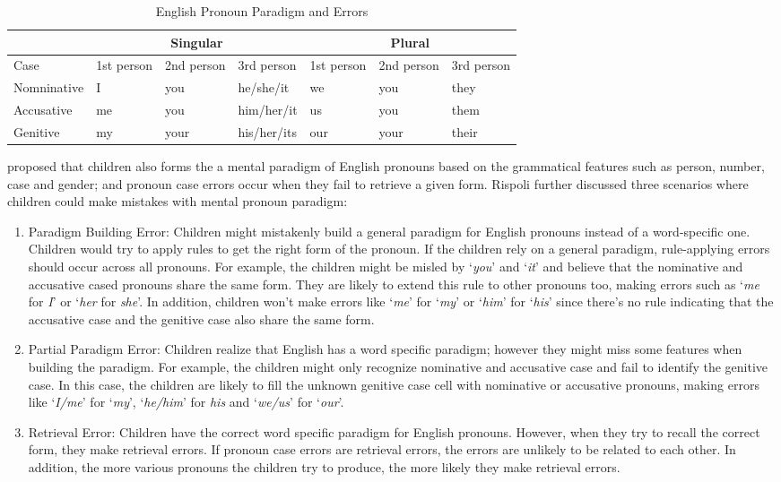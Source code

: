 \FloatBarrier
\begin{table}[!h]
\centering
\caption{English Pronoun Paradigm and Errors}
\label{tab:englishparadigm}
\begin{tabular}{l|lll|lll}
\toprule
 & \multicolumn{3}{|c}{Singular} & \multicolumn{3}{|c}{Plural} \\ \hline
Case & 1st person & 2nd person & 3rd person & 1st person & 2nd person & 3rd person \\ \hline
Nomninative & I & you & he/she/it & we & you & they \\
Accusative & me & you & him/her/it & us & you & them \\
Genitive & my & your & his/her/its & our & your & their\\
\bottomrule
\end{tabular}
\end{table}
\FloatBarrier

\cite{rispoli1994,rispoli1998, rispoli2005} proposed that children also forms the a mental paradigm of English pronouns based on the grammatical features such as person, number, case and gender; and pronoun case errors occur when they fail to retrieve a given form. Rispoli further discussed three scenarios where children could make mistakes with mental pronoun paradigm:
\begin{enumerate}
    \item Paradigm Building Error: Children might mistakenly build a general paradigm for English pronouns instead of a word-specific one. Children would try to apply rules to get the right form of the pronoun. If the children rely on a general paradigm, rule-applying errors should occur across all pronouns. For example, the children might be misled by `\textit{you}' and `\textit{it}' and believe that the nominative and accusative cased pronouns share the same form. They are likely to extend this rule to other pronouns too, making errors such as `\textit{me} for \textit{I}' or `\textit{her} for \textit{she}'. In addition, children won't make errors like `\textit{me}' for `\textit{my}' or `\textit{him}' for `\textit{his}' since there's no rule indicating that the accusative case and the genitive case also share the same form. 
    \item Partial Paradigm Error: Children realize that English has a word specific paradigm; however they might miss some features when building the paradigm. For example, the children might only recognize nominative and accusative case and fail to identify the genitive case. In this case, the children are likely to fill the unknown genitive case cell with nominative or accusative pronouns, making errors like `\textit{I/me}' for `\textit{my}', `\textit{he/him}' for \textit{his} and `\textit{we/us}' for `\textit{our}'. 
    \item Retrieval Error: Children have the correct word specific paradigm for English pronouns. However, when they try to recall the correct form, they make retrieval errors. If pronoun case errors are retrieval errors, the errors are unlikely to be related to each other. In addition, the more various pronouns the children try to produce, the more likely they make retrieval errors. 
\end{enumerate}

